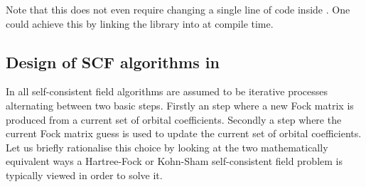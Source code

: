 Note that this does not even require changing a single line of code inside \gint.
One could achieve this by linking the library into \molsturm at compile time.

%
%
\subsection{Design of SCF algorithms in \gscf}

In \gscf all self-consistent field algorithms are assumed to be
iterative processes alternating between two basic steps.
Firstly an  step where a new Fock matrix is produced from a current set of
orbital coefficients.
Secondly a  step where the current Fock matrix guess
is used to update the current set of orbital coefficients.
Let us briefly rationalise this choice by 
looking at the two mathematically equivalent
ways a
Hartree-Fock or Kohn-Sham self-consistent field problem is typically
viewed in order to solve it.


